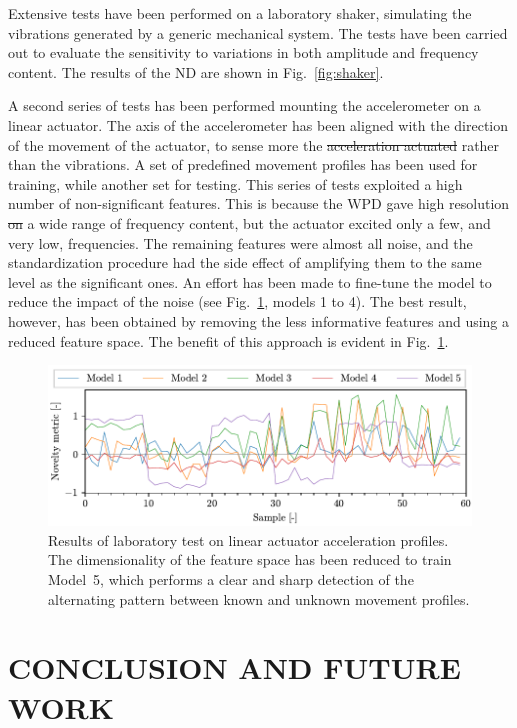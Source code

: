 \documentclass[a4paper, 10pt, conference, oneside]{ieeeconf}
\providecommand{\DIFaddtex}[1]{{\protect\color{blue}\uwave{#1}}} %
\providecommand{\DIFdeltex}[1]{{\protect\color{red}\sout{#1}}}                      %
\providecommand{\DIFaddbegin}{} %
\providecommand{\DIFaddend}{} %
\providecommand{\DIFdelbegin}{} %
\providecommand{\DIFdelend}{} %
\providecommand{\DIFadd}[1]{\texorpdfstring{\DIFaddtex{#1}}{#1}} %
\providecommand{\DIFdel}[1]{\texorpdfstring{\DIFdeltex{#1}}{}} %
\newcommand{\DIFscaledelfig}{0.5}
\newlength{\DIFdelgraphicswidth} %
\newlength{\DIFdelgraphicsheight} %
\newcommand{\DIFaddincludegraphics}[2][]{{\color{blue}\fbox{\DIFOincludegraphics[#1]{#2}}}} %
\newcommand{\DIFdelincludegraphics}[2][]{%
\sbox{\DIFdelgraphicsbox}{\DIFOincludegraphics[#1]{#2}}%
\settoboxwidth{\DIFdelgraphicswidth}{\DIFdelgraphicsbox} %
\settoboxtotalheight{\DIFdelgraphicsheight}{\DIFdelgraphicsbox} %
\scalebox{\DIFscaledelfig}{%
\parbox[b]{\DIFdelgraphicswidth}{\usebox{\DIFdelgraphicsbox}\\[-\baselineskip] \rule{\DIFdelgraphicswidth}{0em}}\llap{\resizebox{\DIFdelgraphicswidth}{\DIFdelgraphicsheight}{%
\setlength{\unitlength}{\DIFdelgraphicswidth}%
\begin{picture}(1,1)%
\thicklines\linethickness{2pt} %
{\color[rgb]{1,0,0}\put(0,0){\framebox(1,1){}}}%
{\color[rgb]{1,0,0}\put(0,0){\line( 1,1){1}}}%
{\color[rgb]{1,0,0}\put(0,1){\line(1,-1){1}}}%
\end{picture}%
}\hspace*{3pt}}} %
} %
\DeclareRobustCommand{\DIFaddbegin}{\DIFOaddbegin \let\includegraphics\DIFaddincludegraphics} %
\DeclareRobustCommand{\DIFaddend}{\DIFOaddend \let\includegraphics\DIFOincludegraphics} %
\DeclareRobustCommand{\DIFdelbegin}{\DIFOdelbegin \let\includegraphics\DIFdelincludegraphics} %
\DeclareRobustCommand{\DIFdelend}{\DIFOaddend \let\includegraphics\DIFOincludegraphics} %
\begin{document}
Extensive tests have been performed on a laboratory shaker, simulating the vibrations generated by a generic mechanical system. The tests have been carried out to evaluate the sensitivity to variations in both amplitude and frequency content. The results of the ND are shown in Fig.~\ref{fig:shaker}.

A second series of tests has been performed mounting the accelerometer on a linear actuator. The axis of the accelerometer has been aligned with the direction of the movement of the actuator, to sense more the \DIFdelbegin \DIFdel{acceleration actuated }\DIFdelend \DIFaddbegin \DIFadd{actuated acceleration }\DIFaddend rather than the vibrations. A set of predefined movement profiles has been used for training, while another set for testing. This series of tests exploited a high number of non-significant features. This is because the WPD gave high resolution \DIFdelbegin \DIFdel{on }\DIFdelend \DIFaddbegin \DIFadd{over }\DIFaddend a wide range of frequency content, but the actuator excited only a few, and very low, frequencies. The remaining features were almost all noise, and the standardization procedure had the side effect of amplifying them to the same level as the significant ones. An effort has been made to fine-tune the model to reduce the impact of the noise (see Fig.~\ref{fig:linear}, models 1 to 4). The best result, however, has been obtained by removing the less informative features and using a reduced feature space. The benefit of this approach is evident in Fig.~\ref{fig:linear}.


\begin{figure}
    \includegraphics[width=\linewidth]{images/linear.pdf}
    \caption{Results of laboratory test on linear actuator acceleration profiles. The dimensionality of the feature space has been reduced to train Model~5, which performs a clear and sharp detection of the alternating pattern between known and unknown movement profiles.}
    \label{fig:linear}
\end{figure} \section{CONCLUSION AND FUTURE WORK}
\end{document}
